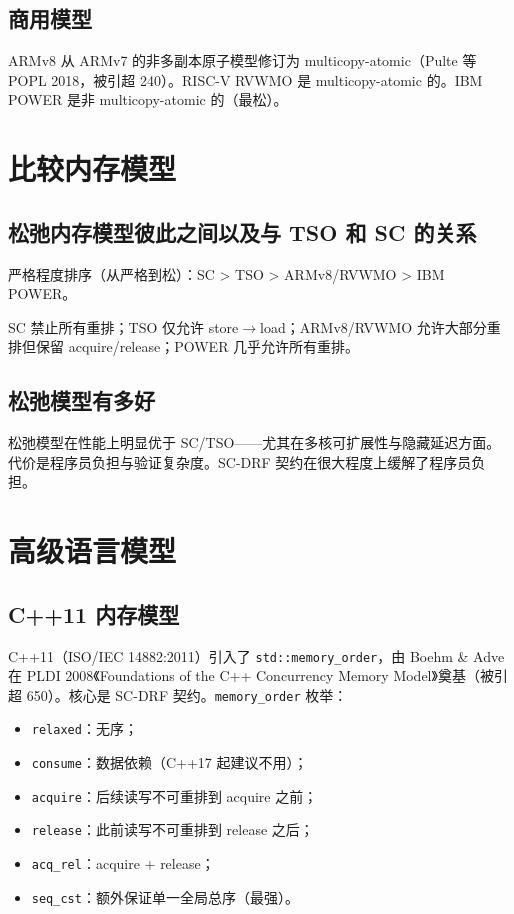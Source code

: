 \subsection{商用模型}

ARMv8 从 ARMv7 的非多副本原子模型修订为 multicopy-atomic（Pulte 等 POPL 2018，被引超 240）。RISC-V RVWMO 是 multicopy-atomic 的。IBM POWER 是非 multicopy-atomic 的（最松）。

\section{比较内存模型}

\subsection{松弛内存模型彼此之间以及与 TSO 和 SC 的关系}

严格程度排序（从严格到松）：SC > TSO > ARMv8/RVWMO > IBM POWER。

SC 禁止所有重排；TSO 仅允许 store$\rightarrow$load；ARMv8/RVWMO 允许大部分重排但保留 acquire/release；POWER 几乎允许所有重排。

\subsection{松弛模型有多好}

松弛模型在性能上明显优于 SC/TSO——尤其在多核可扩展性与隐藏延迟方面。代价是程序员负担与验证复杂度。SC-DRF 契约在很大程度上缓解了程序员负担。

\section{高级语言模型}

\subsection{C++11 内存模型}

C++11（ISO/IEC 14882:2011）引入了 \texttt{std::memory\_order}，由 Boehm \& Adve 在 PLDI 2008《Foundations of the C++ Concurrency Memory Model》奠基（被引超 650）。核心是 SC-DRF 契约。\texttt{memory\_order} 枚举：

\begin{itemize}
\item \texttt{relaxed}：无序；
\item \texttt{consume}：数据依赖（C++17 起建议不用）；
\item \texttt{acquire}：后续读写不可重排到 acquire 之前；
\item \texttt{release}：此前读写不可重排到 release 之后；
\item \texttt{acq\_rel}：acquire + release；
\item \texttt{seq\_cst}：额外保证单一全局总序（最强）。
\end{itemize}


